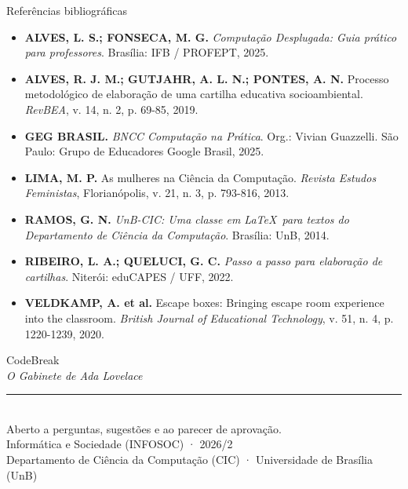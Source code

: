 \documentclass[aspectratio=169, 10pt, t]{beamer}
\begin{document}
\begin{frame}{Referências bibliográficas}
  \scriptsize
  \begin{itemize}
    \item \textbf{ALVES, L. S.; FONSECA, M. G.} \textit{Computação Desplugada: Guia prático para professores}. Brasília: IFB / PROFEPT, 2025.
    \item \textbf{ALVES, R. J. M.; GUTJAHR, A. L. N.; PONTES, A. N.} Processo metodológico de elaboração de uma cartilha educativa socioambiental. \textit{RevBEA}, v. 14, n. 2, p. 69-85, 2019.
    \item \textbf{GEG BRASIL.} \textit{BNCC Computação na Prática}. Org.: Vivian Guazzelli. São Paulo: Grupo de Educadores Google Brasil, 2025.
    \item \textbf{LIMA, M. P.} As mulheres na Ciência da Computação. \textit{Revista Estudos Feministas}, Florianópolis, v. 21, n. 3, p. 793-816, 2013.
    \item \textbf{RAMOS, G. N.} \textit{UnB-CIC: Uma classe em \LaTeX\ para textos do Departamento de Ciência da Computação}. Brasília: UnB, 2014.
    \item \textbf{RIBEIRO, L. A.; QUELUCI, G. C.} \textit{Passo a passo para elaboração de cartilhas}. Niterói: eduCAPES / UFF, 2022.
    \item \textbf{VELDKAMP, A. et al.} Escape boxes: Bringing escape room experience into the classroom. \textit{British Journal of Educational Technology}, v. 51, n. 4, p. 1220-1239, 2020.
  \end{itemize}
\end{frame}

\begin{frame}[plain]
  \vspace*{4em}
  \begin{center}
    {\titlefont\fontsize{34}{36}\selectfont CodeBreak}\\[0.2em]
    {\titlefont\itshape\fontsize{18}{20}\selectfont\color{Cyan}O Gabinete de Ada Lovelace}\\[0.7em]
    {\color{Cyan}\rule{3em}{0.6pt}}\\[0.9em]
    {\small\color{TextMuted}Aberto a perguntas, sugestões e ao parecer de aprovação.}\\[1.2em]
    {\scriptsize\color{TextMuted}Informática e Sociedade (INFOSOC) · 2026/2\\
    Departamento de Ciência da Computação (CIC) · Universidade de Brasília (UnB)}
  \end{center}
\end{frame}
\end{document}
